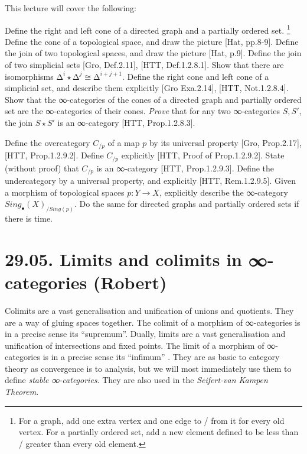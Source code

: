 \documentclass[a4paper]{amsart}
\numberwithin{figure}{section}
\theoremstyle{theorem}
\theoremstyle{definition}
\begin{document}
This lecture will cover the following: 

Define the right and left cone of a directed graph and a partially ordered set.%
\footnote{For a graph, add one extra vertex and one edge to / from it for every old vertex. For a partially ordered set, add a new element defined to be less than / greater than every old element.} %
Define the cone of a topological space, and draw the picture [Hat, pp.8-9]. %
Define the join of two topological spaces, and draw the picture [Hat, p.9]. %
Define the join of two simplicial sets [Gro, Def.2.11], [HTT, Def.1.2.8.1]. %
Show that there are isomorphisms $∆^{i} {\star} ∆^{j} \cong ∆^{i+j+1}$. %
Define the right cone and left cone of a simplicial set, and describe them explicitly [Gro Exa.2.14], [HTT, Not.1.2.8.4]. %
Show that the ∞-categories of the cones of a directed graph and partially ordered set are the ∞-categories of their cones. %
\emph{Prove} that for any two ∞-categories $S, S'$, the join $S \star S'$ is an ∞-category [HTT, Prop.1.2.8.3]. %

Define the overcategory  $C_{/p}$ of a map $p$ by its universal property [Gro, Prop.2.17], [HTT, Prop.1.2.9.2]. %
Define $C_{/p}$  explicitly [HTT, Proof of Prop.1.2.9.2]. %
State (without proof) that $C_{/p}$ is an ∞-category [HTT, Prop.1.2.9.3]. %
Define the undercategory by a universal property, and explicitly [HTT, Rem.1.2.9.5]. %
Given a morphism of topological spaces $p: Y \to X$, explicitly describe the ∞-category $Sing_\bullet(X)_{/Sing(p)}$. %
Do the same for directed graphs and partially ordered sets if there is time.



\section{29.05. Limits and colimits in ∞-categories (Robert)}

Colimits are a vast generalisation and unification of unions and quotients. They are a way of gluing spaces together. The colimit of a morphism of ∞-categories is in a precise sense its ``supremum''. %
Dually, limits are a vast generalisation and unification of intersections and fixed points. The limit of a morphism of ∞-categories is in a precise sense its ``infimum'' . %
They are as basic to category theory as convergence is to analysis, but we will most immediately use them to define \emph{stable ∞-categories}. %
They are also used in the \emph{Seifert-van Kampen Theorem}.
\end{document}
